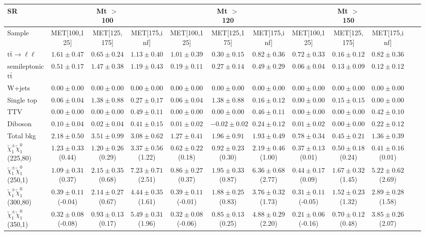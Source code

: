 \begin{table}
\begin{center}
\small
\begin{tabular}{lccccccccccc}
\hline
SR & & Mt $>$ 100 & & & Mt $>$ 120 & & &Mt $>$ 150 & & &\\
\hline
Sample&MET[100,125]&MET[125,175]&MET[175,inf]&MET[100,125]&MET[125,175]&MET[175,inf]&MET[100,125]&MET[125,175]&MET[175,inf]&\\
\hline
$\mathrm{t}\bar{\mathrm{t}}\rightarrow \ell\ell$&$1.61\pm0.47$&$0.65\pm0.24$&$1.13\pm0.40$&$1.01\pm0.39$&$0.30\pm0.15$&$0.82\pm0.36$&$0.72\pm0.33$&$0.16\pm0.12$&$0.82\pm0.36$\\
semileptonic $\mathrm{t}\bar{\mathrm{t}}$&$0.51\pm0.17$&$1.47\pm0.38$&$1.19\pm0.43$&$0.19\pm0.11$&$0.27\pm0.14$&$0.49\pm0.29$&$0.06\pm0.04$&$0.13\pm0.09$&$0.12\pm0.12$\\
W+jets&$0.00\pm0.00$&$0.00\pm0.00$&$0.00\pm0.00$&$0.00\pm0.00$&$0.00\pm0.00$&$0.00\pm0.00$&$0.00\pm0.00$&$0.00\pm0.00$&$0.00\pm0.00$\\
Single top&$0.06\pm0.04$&$1.38\pm0.88$&$0.27\pm0.17$&$0.06\pm0.04$&$1.38\pm0.88$&$0.16\pm0.12$&$0.00\pm0.00$&$0.15\pm0.15$&$0.00\pm0.00$\\
TTV&$0.00\pm0.00$&$0.00\pm0.00$&$0.49\pm0.11$&$0.00\pm0.00$&$0.00\pm0.00$&$0.46\pm0.11$&$0.00\pm0.00$&$0.00\pm0.00$&$0.42\pm0.10$\\
Diboson&$0.10\pm0.04$&$0.02\pm0.04$&$0.41\pm0.15$&$0.01\pm0.02$&$-0.02\pm0.02$&$0.24\pm0.12$&$0.01\pm0.02$&$0.00\pm0.00$&$0.22\pm0.12$\\
\hline
Total bkg&$2.18\pm0.50$&$3.51\pm0.99$&$3.08\pm0.62$&$1.27\pm0.41$&$1.96\pm0.91$&$1.93\pm0.49$&$0.78\pm0.34$&$0.45\pm0.21$&$1.36\pm0.39$\\
$\tilde{\chi}_{1}^{\pm}\tilde{\chi}_{1}^{0}$ (225,80)&$1.23\pm0.33$(0.44)&$1.20\pm0.26$(0.29)&$3.37\pm0.56$(1.22)&$0.62\pm0.22$(0.18)&$0.92\pm0.23$(0.30)&$2.19\pm0.46$(1.00)&$0.37\pm0.13$(0.01)&$0.50\pm0.18$(0.24)&$0.41\pm0.16$(0.01)\\
$\tilde{\chi}_{1}^{\pm}\tilde{\chi}_{1}^{0}$ (250,1)&$1.09\pm0.31$(0.37)&$2.15\pm0.35$(0.68)&$7.23\pm0.71$(2.51)&$0.86\pm0.27$(0.37)&$1.95\pm0.33$(0.87)&$6.36\pm0.68$(2.77)&$0.44\pm0.17$(0.09)&$1.67\pm0.32$(1.45)&$5.22\pm0.62$(2.69)\\
$\tilde{\chi}_{1}^{\pm}\tilde{\chi}_{1}^{0}$ (300,80)&$0.39\pm0.11$(-0.04)&$2.14\pm0.27$(0.67)&$4.44\pm0.35$(1.61)&$0.39\pm0.11$(-0.01)&$1.88\pm0.25$(0.83)&$3.76\pm0.32$(1.73)&$0.31\pm0.11$(-0.05)&$1.52\pm0.23$(1.32)&$2.89\pm0.28$(1.58)\\
$\tilde{\chi}_{1}^{\pm}\tilde{\chi}_{1}^{0}$ (350,1)&$0.32\pm0.08$(-0.08)&$0.93\pm0.13$(0.17)&$5.49\pm0.31$(1.96)&$0.32\pm0.08$(-0.06)&$0.85\pm0.13$(0.25)&$4.88\pm0.29$(2.20)&$0.21\pm0.06$(-0.16)&$0.70\pm0.12$(0.48)&$3.85\pm0.26$(2.07)\\
\hline
\hline\hline
\end{tabular}
\end{center}
\end{table}
